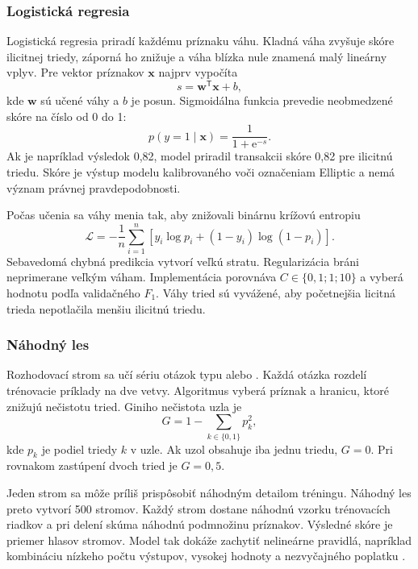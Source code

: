 \subsubsection{Logistická regresia}

Logistická regresia priradí každému príznaku váhu. Kladná váha zvyšuje
skóre ilicitnej triedy, záporná ho
znižuje a váha blízka nule znamená malý lineárny vplyv. Pre vektor
príznakov $\mathbf{x}$ najprv vypočíta
\begin{equation}
  s=\mathbf{w}^{\mathsf T}\mathbf{x}+b,
\end{equation}
kde $\mathbf{w}$ sú učené váhy a $b$ je posun. Sigmoidálna funkcia
prevedie neobmedzené skóre na číslo od 0 do 1:
\begin{equation}
  p(y=1\mid\mathbf{x})=\frac{1}{1+\mathrm{e}^{-s}}.
  \label{eq:logistic-sigmoid}
\end{equation}
Ak je napríklad výsledok 0,82, model priradil transakcii skóre 0,82
pre ilicitnú triedu. Skóre je výstup modelu kalibrovaného voči
označeniam Elliptic a nemá význam právnej pravdepodobnosti.

Počas učenia sa váhy menia tak, aby znižovali binárnu krížovú entropiu
\begin{equation}
  \mathcal{L}=-\frac{1}{n}\sum_{i=1}^{n}
  \left[y_i\log p_i+(1-y_i)\log(1-p_i)\right].
\end{equation}
Sebavedomá chybná predikcia vytvorí veľkú stratu. Regularizácia bráni
neprimerane veľkým váham. Implementácia porovnáva
$C\in\{0{,}1;1;10\}$ a vyberá hodnotu podľa validačného $F_1$.
Váhy tried sú vyvážené, aby početnejšia licitná trieda nepotlačila
menšiu ilicitnú triedu.

\subsubsection{Náhodný les}

Rozhodovací strom sa učí sériu otázok typu  alebo . Každá otázka
rozdelí trénovacie príklady na dve vetvy. Algoritmus vyberá príznak a
hranicu, ktoré znižujú nečistotu tried. Giniho nečistota uzla je
\begin{equation}
  G=1-\sum_{k\in\{0,1\}}p_k^2,
  \label{eq:gini}
\end{equation}
kde $p_k$ je podiel triedy $k$ v uzle. Ak uzol obsahuje iba jednu
triedu, $G=0$. Pri rovnakom zastúpení dvoch tried je $G=0{,}5$.

Jeden strom sa môže príliš prispôsobiť náhodným detailom tréningu.
Náhodný les preto vytvorí 500 stromov. Každý strom dostane náhodnú
vzorku trénovacích riadkov a pri delení skúma náhodnú podmnožinu
príznakov. Výsledné skóre je priemer hlasov stromov. Model tak dokáže
zachytiť nelineárne pravidlá, napríklad kombináciu nízkeho počtu
výstupov, vysokej hodnoty a nezvyčajného poplatku
\cite{breiman2001random}.

